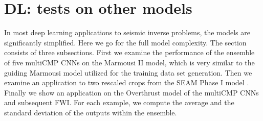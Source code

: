 \documentclass[paper,twocolomn]{geophysics}
\begin{document}
\section{DL: tests on other models}
In most deep learning applications to seismic inverse problems, the models are significantly simplified. Here we go for the full model complexity. The section consists of three subsections. First we examine the performance of the ensemble of five multiCMP CNNs on the Marmousi II model, which is very similar to the guiding Marmousi model utilized for the training data set generation. 
%
%
Then we examine an application to two rescaled crops from the SEAM Phase I model \citep{fehler2011seam}. Finally we show an application on the Overthrust model of the multiCMP CNNs and subsequent FWI. For each example, we compute the average and the standard deviation of the outputs within the ensemble.




\end{document}
